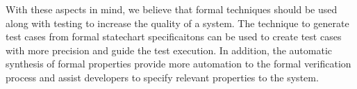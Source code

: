 With these aspects in mind, we believe that formal techniques should be used along with testing to increase the quality of a system. The technique to generate test cases from formal statechart specificaitons can be used to create test cases with more precision and guide the test execution. In addition, the automatic synthesis of formal properties provide more automation to the formal verification process and assist developers to specify relevant properties to the system.

